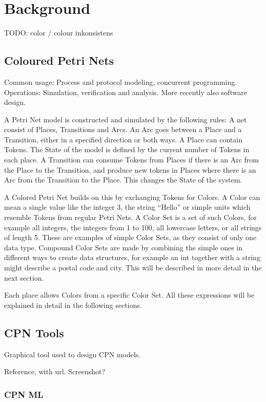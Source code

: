 \chapter{Background}
\label{chap:background}

TODO: color / colour inkonsistens

\section{Coloured Petri Nets}
Common usage: Process and protocol modeling, concurrent programming. Operations:
Simulation, verification and analysis. More recently also software design.


A Petri Net model is constructed and simulated by the following rules: A net
consist of Places, Transitions and Arcs. An Arc goes between a Place and a
Transition, either in a specified direction or both ways. A Place can contain
Tokens. The State of the model is defined by the current number of Tokens in
each place. A Transition can consume Tokens from Places if there is an Arc from
the Place to the Transition, and produce new tokens in Places where there is an
Arc from the Transition to the Place. This changes the State of the system.

A Colored Petri Net builds on this by exchanging Tokens for Colors.
A Color can mean a single value like the integer 3, the string ``Hello'' or
simple units which resemble Tokens from regular Petri Nets. A Color Set is a
set of such Colors, for example all integers, the integers from 1 to 100, all
lowercase letters, or all strings of length 5. These are examples of simple
Color Sets, as they consist of only one data type. Compound Color Sets are made
by combining the simple ones in different ways to create data structures, for
example an int together with a string might describe a postal code and city.
This will be described in more detail in the next section.

Each place allows Colors from a specific Color Set. 
All these expressions will be explained in detail in the following sections.

\section{CPN Tools}

Graphical tool used to design CPN models. 

Reference, with url. Screenshot?

\subsection{CPN ML}
	
